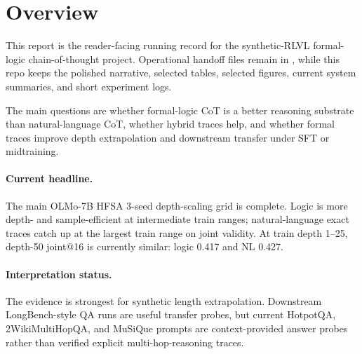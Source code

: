\section{Overview}

This report is the reader-facing running record for the synthetic-RLVL formal-logic
chain-of-thought project. Operational handoff files remain in \repo{}, while this
repo keeps the polished narrative, selected tables, selected figures, current
system summaries, and short experiment logs.

The main questions are whether formal-logic CoT is a better reasoning substrate
than natural-language CoT, whether hybrid traces help, and whether formal traces
improve depth extrapolation and downstream transfer under SFT or midtraining.

\paragraph{Current headline.}
The main OLMo-7B HFSA 3-seed depth-scaling grid is complete. Logic is more
depth- and sample-efficient at intermediate train ranges; natural-language
exact traces catch up at the largest train range on joint validity. At
train depth 1--25, depth-50 joint@16 is currently similar: logic 0.417 and
NL 0.427.

\paragraph{Interpretation status.}
The evidence is strongest for synthetic length extrapolation. Downstream
LongBench-style QA runs are useful transfer probes, but current HotpotQA,
2WikiMultiHopQA, and MuSiQue prompts are context-provided answer probes rather
than verified explicit multi-hop-reasoning traces.
